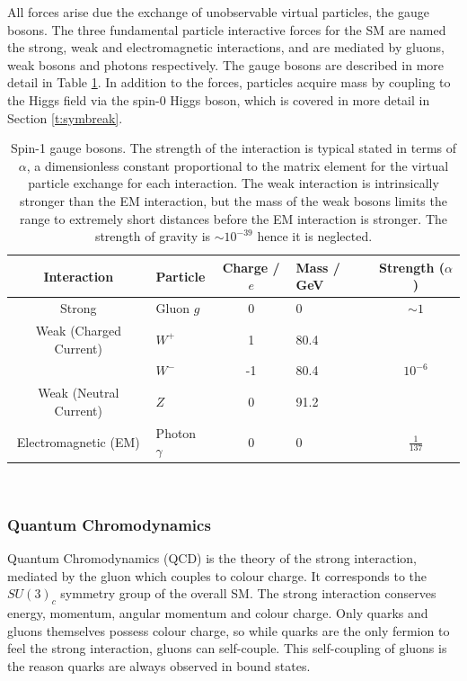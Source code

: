 		All forces arise due the exchange of unobservable virtual particles, the gauge bosons. The three fundamental particle interactive forces for the SM are named the strong, weak and electromagnetic interactions, and are mediated by gluons, weak bosons and photons respectively. The gauge bosons are described in more detail in Table \ref{t:tab:boson}. In addition to the forces, particles acquire mass by coupling to the Higgs field via the spin-0 Higgs boson, which is covered in more detail in Section \ref{t:symbreak}. 
		
		\begin{table}[ht]
			\caption{Spin-1 gauge bosons. The strength of the interaction is typical stated in terms of $\alpha$, a dimensionless constant proportional to the matrix element for the virtual particle exchange for each interaction. The weak interaction is intrinsically stronger than the EM interaction, but the mass of the weak bosons limits the range to extremely short distances before the EM interaction is stronger.  The strength of gravity is $\sim 10^{-39}$ hence it is neglected. \cite{pdg}}
			\label{t:tab:boson}
			\medskip
			\centering
			\begin{tabular}{clclc}\toprule
				Interaction & Particle & Charge / $e$ & Mass / GeV & Strength ($\alpha$) \\\midrule
				Strong    &     Gluon $g$      &    0   & 0& $\sim1$\\
				Weak (Charged Current)&     $W^+$    &    1   & 80.4 & \\
				&     $W^-$    &    -1   & 80.4 & $10^{-6}$ \\
				Weak (Neutral Current)&     $Z$   &    0   & 91.2 & \\
				Electromagnetic (EM)   &     Photon $\gamma$  &   0   & 0 & $\frac{1}{137}$\\\bottomrule
			\end{tabular}\\[5pt]
		\end{table}
		
		\subsubsection{Quantum Chromodynamics}
		
		Quantum Chromodynamics (QCD) is the theory of the strong interaction, mediated by the gluon which couples to colour charge. It corresponds to the $SU(3)_c$ symmetry group of the overall SM. The strong interaction conserves energy, momentum, angular momentum and colour charge. Only quarks and gluons themselves possess colour charge, so while quarks are the only fermion to feel the strong interaction, gluons can self-couple. This self-coupling of gluons is the reason quarks are always observed in bound states.
		
